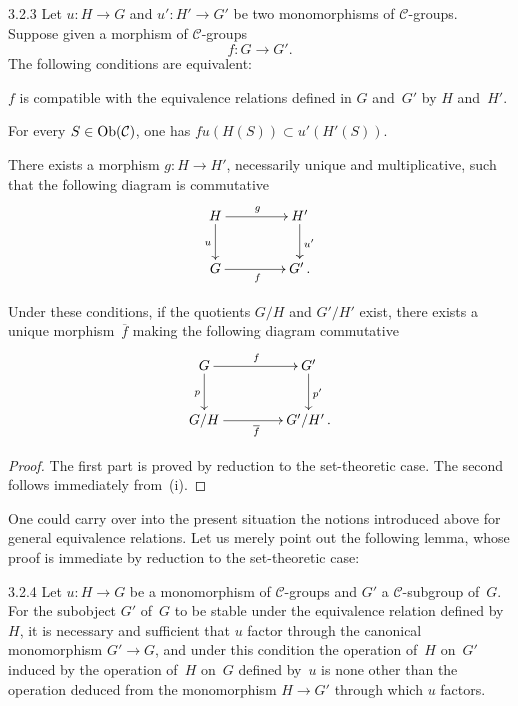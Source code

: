 \begin{lemma}{3.2.3}
\label{IV.3.2.3}
Let \(u\colon H\to G\) and \(u'\colon H'\to G'\) be two monomorphisms of
\(\mathcal{C}\)-groups. Suppose given a morphism of \(\mathcal{C}\)-groups
\[
f\colon G\longrightarrow G'.
\]
The following conditions are equivalent:
\begin{enumeratei}
\item \(f\) is compatible with the equivalence relations defined in \(G\)
and~\(G'\) by \(H\) and~\(H'\).
\item For every \(S\in\operatorname{Ob}(\mathcal{C})\), one has
\(fu(H(S))\subset u'(H'(S))\).
\item There exists a morphism \(g\colon H\to H'\), necessarily unique and
multiplicative, such that the following diagram is commutative
\[
\xymatrix@C=4.2em@R=2.4em{
H \ar[r]^{g} \ar[d]_{u}
  & H' \ar[d]^{u'} \\
G \ar[r]_{f}
  & G'\,.
}
\]
\end{enumeratei}
Under these conditions, if the quotients \(G/H\) and \(G'/H'\) exist, there
exists a unique morphism~\(\overline{f}\) making the following diagram commutative
\[
\xymatrix@C=4.2em@R=2.4em{
G \ar[r]^{f} \ar[d]_{p}
  & G' \ar[d]^{p'} \\
G/H \ar[r]_{\overline{f}}
  & G'/H'\,.
}
\]
\end{lemma}

\begin{proof}
The first part is proved by reduction to the set-theoretic case. The second
follows immediately from~(i).
\end{proof}

One could carry over into the present situation the notions introduced above
for general equivalence relations.
Let us merely point out the following lemma, whose proof is immediate by
reduction to the set-theoretic case:

\begin{lemma}{3.2.4}
\label{IV.3.2.4}
Let \(u\colon H\to G\) be a monomorphism of \(\mathcal{C}\)-groups and \(G'\)
a \(\mathcal{C}\)-subgroup of~\(G\). For the subobject \(G'\) of~\(G\) to be
stable under the equivalence relation defined by~\(H\), it is necessary and
sufficient that \(u\) factor through the canonical monomorphism \(G'\to G\),
and under this condition the operation of~\(H\) on~\(G'\) induced by the
operation of~\(H\) on~\(G\) defined by~\(u\) is none other than the operation
deduced from the monomorphism \(H\to G'\) through which \(u\) factors.
\end{lemma}

